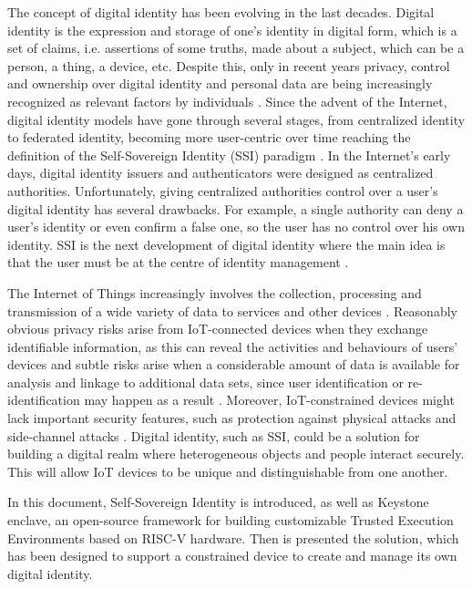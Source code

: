 
The concept of digital identity has been evolving in the last decades. Digital identity is the expression and storage of one's identity in digital form, which is a set of claims, i.e. assertions of some truths, made about a subject, which can be a person, a thing, a device, etc. Despite this, only in recent years privacy, control and ownership over digital identity and personal data are being increasingly recognized as relevant factors by individuals \cite{TheLawsOfIdentity}. 
Since the advent of the Internet, digital identity models have gone through several stages, from centralized identity to federated identity, becoming more user-centric over time reaching the definition of the Self-Sovereign Identity (SSI) paradigm \cite{ThePathToSSI}.
In the Internet's early days, digital identity issuers and authenticators were designed as centralized authorities. Unfortunately, giving centralized authorities control over a user's digital identity has several drawbacks. For example, a single authority can deny a user's identity or even confirm a false one, so the user has no control over his own identity. SSI is the next development of digital identity where the main idea is that the user must be at the centre of identity management \cite{ThePathToSSI}.


The Internet of Things increasingly involves the collection, processing and transmission of a wide variety of data to services and other devices \cite{wilson2018digital}. Reasonably obvious privacy risks arise from IoT-connected devices when they exchange identifiable information, as this can reveal the activities and behaviours of users' devices and subtle risks arise when a considerable amount of data is available for analysis and linkage to additional data sets, since user identification or re-identification may happen as a result \cite{wilson2018digital}. Moreover, IoT-constrained devices might lack important security features, such as protection against physical attacks \cite{IoTattacks} and side-channel attacks \cite{SideChannel, AC2}. Digital identity, such as SSI, could be a solution for building a digital realm where heterogeneous objects and people interact securely. This will allow IoT devices to be unique and distinguishable from one another.


In this document, Self-Sovereign Identity is introduced, as well as Keystone enclave, an open-source framework for building customizable Trusted Execution Environments based on RISC-V hardware. Then is presented the solution, which has been designed to support a constrained device to create and manage its own digital identity. 


